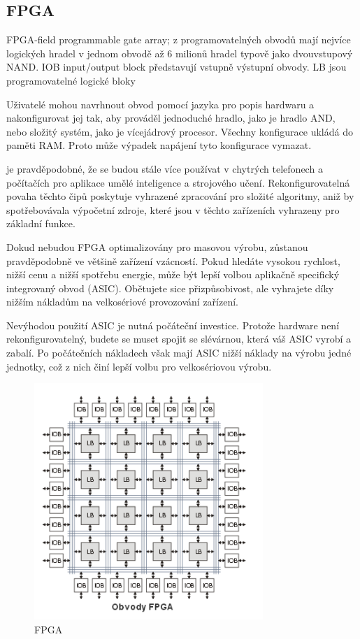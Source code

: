 \subsection{FPGA}
FPGA-field programmable gate array; z programovatelných obvodů mají nejvíce
logických hradel v jednom obvodě až 6 milionů hradel typově jako dvouvstupový NAND.
IOB input/output block představují vstupně výstupní obvody. LB jsou programovatelné
logické bloky

Uživatelé mohou navrhnout obvod pomocí jazyka pro popis hardwaru a nakonfigurovat jej tak, aby prováděl jednoduché hradlo, jako je hradlo AND, nebo složitý systém, jako je vícejádrový procesor. Všechny konfigurace ukládá do paměti RAM. Proto může výpadek napájení tyto konfigurace vymazat.

je pravděpodobné, že se budou stále více používat v chytrých telefonech a počítačích pro aplikace umělé inteligence a strojového učení. Rekonfigurovatelná povaha těchto čipů poskytuje vyhrazené zpracování pro složité algoritmy, aniž by spotřebovávala výpočetní zdroje, které jsou v těchto zařízeních vyhrazeny pro základní funkce.

Dokud nebudou FPGA optimalizovány pro masovou výrobu, zůstanou pravděpodobně ve většině zařízení vzácností. Pokud hledáte vysokou rychlost, nižší cenu a nižší spotřebu energie, může být lepší volbou aplikačně specifický integrovaný obvod (ASIC). Obětujete sice přizpůsobivost, ale vyhrajete díky nižším nákladům na velkosériové provozování zařízení.

Nevýhodou použití ASIC je nutná počáteční investice. Protože hardware není rekonfigurovatelný, budete se muset spojit se slévárnou, která váš ASIC vyrobí a zabalí. Po počátečních nákladech však mají ASIC nižší náklady na výrobu jedné jednotky, což z nich činí lepší volbu pro velkosériovou výrobu.

    \begin{figure}[h]
   \begin{center}
     \includegraphics[scale=0.6]{images/FPGA.png}
   \end{center}
   \caption{FPGA}
  \end{figure}

